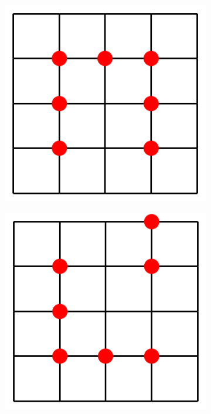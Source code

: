 \documentclass[a4paper]{article}
\begin{document}
\begin{figure}[ht]
\begin{subfigure}[b]{0.2\linewidth}
    \includegraphics[width=0.75\linewidth]{figures/maze_5x5_2.png} 
    \caption{} 
    \vspace{4ex}
  \end{subfigure}%
    \begin{subfigure}[b]{0.2\linewidth}
    \centering
    \includegraphics[width=0.75\linewidth]{figures/maze_5x5_3.png} 
    \caption{} 
    \vspace{4ex}
  \end{subfigure}%
    \begin{subfigure}[b]{0.2\linewidth}
    \centering

\end{subfigure}
\end{figure}
\end{document}
